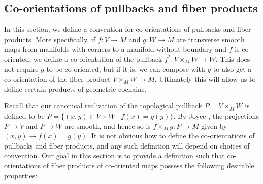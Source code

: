 \begin{comment}
		On the other hand, consider $(\bd W) \times I$ as part of the boundary of $W \times I$.
		The standard boundary co-orientation for $(\bd W) \times I$ in $W \times I$ is $(\beta_{(\bd W) \times I},\beta_{(\bd W) \times I}\wedge\beta_{\nu_\bd})$.
		This is independent of the choice of $\beta_{(\bd W) \times I}$, so we may take $\beta_{(\bd W) \times I} = \beta_W \wedge \beta_{e_1}$, where $\beta_{e_1}$ is positively-directed in $I$.
		Then
		$$(\beta_{(\bd W) \times I},\beta_{(\bd W) \times I}\wedge\beta_{\nu_\bd}) = (\beta_{\bd W} \wedge \beta_{e_1},\beta_{\bd W} \wedge \beta_{e_1}\wedge\beta_{\nu_\bd}) = -(\beta_{\bd W} \wedge \beta_{e_1},\beta_{\bd W} \wedge \beta_{\nu_\bd}\wedge\beta_{\nu_I}).$$
		Composing with the induced co-orientation $(\beta_W \wedge \beta_{e_1},\beta_M)$ of $G$ gives the composite $(\bd W) \times I \xr{i_{(\bd W) \times I}}W \times I \xr{G} M$ the co-orientation $-(\beta_{\bd W} \wedge \beta_{e_1},\beta_M)$ if $\beta_W = \beta_{\bd W} \wedge \beta_{\nu_\bd}$ and $(\beta_{\bd W} \wedge \beta_{e_1},\beta_M)$ otherwise.
		Thus, altogether, the $(\bd W) \times I$ boundary component of $W \times I$ with its boundary co-orientation is $-G_\bd$.
	\end{proof}
\end{comment}

\subsection{Co-orientations of pullbacks and fiber products}\label{S: co-orient pullbacks}

In this section, we define a convention for co-orientations of pullbacks and fiber products.
More specifically, if $f \colon V \to M$ and $g \colon W \to M$ are transverse smooth maps from manifolds with corners to a manifold without boundary and $f$ is co-oriented, we define a co-orientation of the pullback $f^* \colon V \times_M W \to W$.
This does not require $g$ to be co-oriented, but if it is, we can compose with $g$ to also get a co-orientation of the fiber product $V \times_M W \to M$.
Ultimately this will allow us to define certain products of geometric cochains.

Recall that our canonical realization of the topological pullback $P = V \times_M W$ is defined to be $P = \{(x,y) \in V \times W \mid f(x) = g(y)\}$.
By Joyce \cite[Section 6]{Joy12}, the projections $P \to V$ and $P \to W$ are smooth, and hence so is $f \times_M g \colon P \to M$ given by $(x,y) \to f(x) = g(y)$.
It is not obvious how to define the co-orientations of pullbacks and fiber products, and any such definition will depend on choices of convention.
Our goal in this section is to provide a definition such that co-orientations of fiber products of co-oriented maps possess the following desirable properties:

